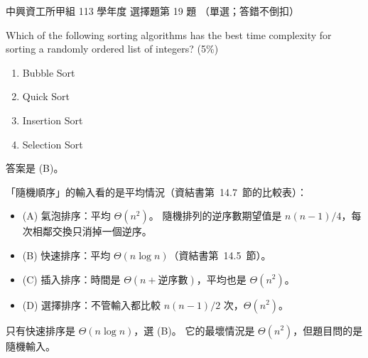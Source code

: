 \begin{pastexam}[label={px:nchu-113-dsa-19}]{中興資工所甲組 113 學年度 選擇題第 19 題}
（單選；答錯不倒扣）

Which of the following sorting algorithms has the best time complexity for sorting a randomly ordered list
of integers? (5\%)
\begin{enumerate}[label=(\Alph*)]
\item Bubble Sort
\item Quick Sort
\item Insertion Sort
\item Selection Sort
\end{enumerate}
\end{pastexam}

\begin{pastsoln}
答案是 (B)。

「隨機順序」的輸入看的是平均情況（資結書第~14.7~節的比較表）：
\begin{itemize}
\item (A) 氣泡排序：平均 $\Theta(n^2)$。 隨機排列的逆序數期望值是 $n(n-1)/4$，每次相鄰交換只消掉一個逆序。
\item (B) 快速排序：平均 $\Theta(n \log n)$（資結書第~14.5~節）。
\item (C) 插入排序：時間是 $\Theta(n + \text{逆序數})$，平均也是 $\Theta(n^2)$。
\item (D) 選擇排序：不管輸入都比較 $n(n-1)/2$ 次，$\Theta(n^2)$。
\end{itemize}
只有快速排序是 $\Theta(n \log n)$，選 (B)。 它的最壞情況是 $\Theta(n^2)$，但題目問的是隨機輸入。
\end{pastsoln}

